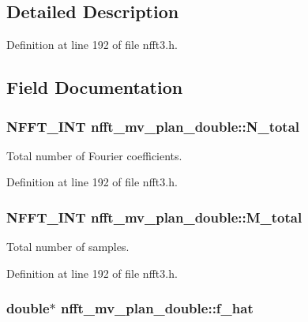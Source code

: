 \subsection{Detailed Description}


Definition at line 192 of file nfft3.\-h.



\subsection{Field Documentation}
\hypertarget{structnfft__mv__plan__double_ad6971700948496aa968785426928432f}{
\subsubsection[{N\-\_\-total}]{\setlength{\rightskip}{0pt plus 5cm}N\-F\-F\-T\-\_\-\-I\-N\-T nfft\-\_\-mv\-\_\-plan\-\_\-double\-::\-N\-\_\-total}}\label{structnfft__mv__plan__double_ad6971700948496aa968785426928432f}


Total number of Fourier coefficients. 



Definition at line 192 of file nfft3.\-h.

\hypertarget{structnfft__mv__plan__double_a7283df8048d60819c83d657060101485}{
\subsubsection[{M\-\_\-total}]{\setlength{\rightskip}{0pt plus 5cm}N\-F\-F\-T\-\_\-\-I\-N\-T nfft\-\_\-mv\-\_\-plan\-\_\-double\-::\-M\-\_\-total}}\label{structnfft__mv__plan__double_a7283df8048d60819c83d657060101485}


Total number of samples. 



Definition at line 192 of file nfft3.\-h.

\hypertarget{structnfft__mv__plan__double_a238489d7a63fda4fc9677f56894e3cac}{
\subsubsection[{f\-\_\-hat}]{\setlength{\rightskip}{0pt plus 5cm}double$\ast$ nfft\-\_\-mv\-\_\-plan\-\_\-double\-::f\-\_\-hat}}\label{structnfft__mv__plan__double_a238489d7a63fda4fc9677f56894e3cac}


